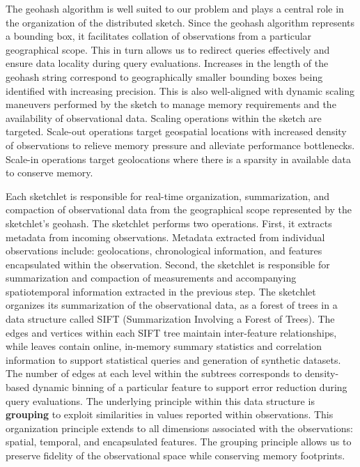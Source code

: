 The geohash algorithm is well suited to our problem and plays a central role in the organization of the distributed sketch. Since the geohash algorithm represents a bounding box, it facilitates collation of observations from a particular geographical scope. This in turn allows us to redirect queries effectively and ensure data locality during query evaluations. Increases in the length of the geohash string correspond to geographically smaller bounding boxes being identified with increasing precision. This is also well-aligned with dynamic scaling maneuvers performed by the sketch to manage memory requirements and the availability of observational data. Scaling operations within the sketch are targeted. Scale-out operations target geospatial locations with increased density of observations to relieve memory pressure and alleviate performance bottlenecks. Scale-in operations target geolocations where there is a sparsity in available data to conserve memory.

Each sketchlet is responsible for real-time organization, summarization, and compaction of observational data from the geographical scope represented by the sketchlet's geohash.  The sketchlet performs two operations. First, it extracts metadata from incoming observations. Metadata extracted from individual observations include: geolocations, chronological information, and features encapsulated within the observation. Second, the sketchlet is responsible for summarization and compaction of measurements and accompanying spatiotemporal information extracted in the previous step. The sketchlet organizes its summarization of the observational data, as a forest of trees in a data structure called SIFT (Summarization Involving a Forest of Trees). The edges and vertices within each SIFT tree maintain inter-feature relationships, while leaves contain online, in-memory summary statistics and correlation information to support statistical queries and generation of synthetic datasets.  The number of edges at each level within the subtrees corresponds to density-based dynamic binning of a particular feature to support error reduction during query evaluations. The underlying principle within this data structure is \textbf{grouping} to exploit similarities in values reported within observations. This organization principle extends to all dimensions associated with the observations: spatial, temporal, and encapsulated features. The grouping principle allows us to preserve fidelity of the observational space while conserving memory footprints.

